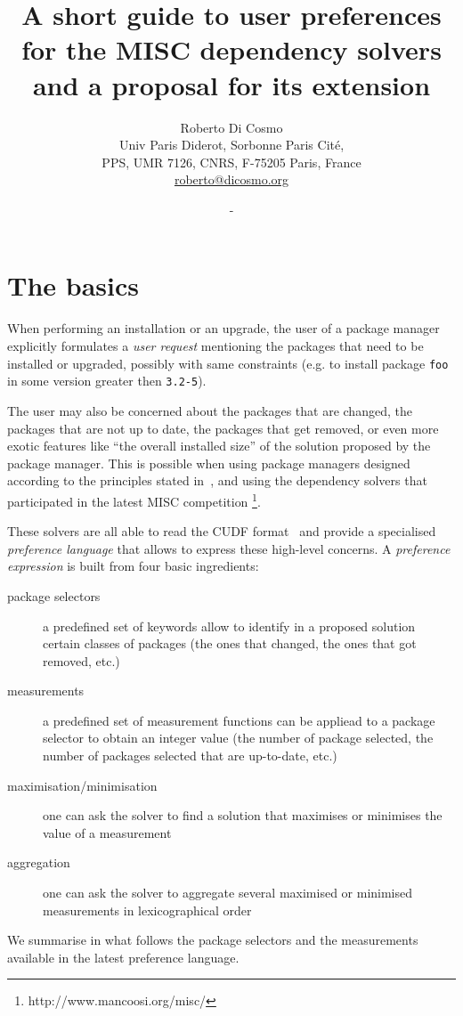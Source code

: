 \documentclass{article}
\title{A short guide to {\bf user preferences}\\ for the MISC dependency solvers\\ and a proposal for its extension}
\author{Roberto Di Cosmo\\Univ Paris Diderot, Sorbonne Paris Cit\'e,\\ PPS, UMR 7126, CNRS,
    F-75205 Paris, France\\\url{roberto@dicosmo.org}}
\date{\DATE{} - \VERSION{}}
\begin{document}
\maketitle

\section{The basics}

When performing an installation or an upgrade, the user of a package manager 
explicitly formulates a \emph{user request} mentioning the packages that need
to be installed or upgraded, possibly with same constraints (e.g. to
install package \texttt{foo} in some version greater then \texttt{3.2-5}).

The user may also be concerned about the packages that are changed, the packages
that are not up to date, the packages that get removed, or even more exotic
features like “the overall installed size” of the solution proposed by the
package manager. This is possible when using package managers designed
according to the principles stated in~\cite{DepSolversNP2012}, and
using the dependency solvers that participated in the latest MISC competition
\footnote{http://www.mancoosi.org/misc/}.

These solvers are all able to read the CUDF format~\cite{mancoosi-tr3} and provide
a specialised \emph{preference language} that allows to express these high-level
concerns.  A \emph{preference expression} is built from four basic ingredients:
\begin{description}
  \item[package selectors] a predefined set of keywords allow to identify in a proposed solution
                           certain classes of packages (the ones that changed, the ones that got removed, etc.)
  \item[measurements] a predefined set of measurement functions can be appliead to a package selector
                      to obtain an integer value (the number of package selected, the number of packages selected that are up-to-date, etc.)
  \item[maximisation/minimisation] one can ask the solver to find a solution that maximises or minimises the value of a measurement 
  \item[aggregation] one can ask the solver to aggregate several maximised or minimised measurements in lexicographical order
\end{description}

We summarise in what follows the package selectors and the measurements available in the latest preference language.
\end{document}
